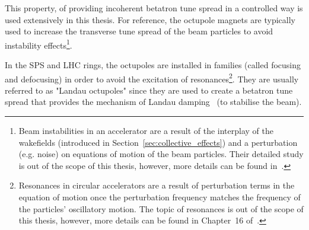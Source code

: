 


This property, of providing incoherent betatron tune spread in a controlled way is used extensively in this thesis. %
For reference, the octupole magnets are typically used to increase the transverse tune spread of the beam particles to avoid %
instability effects\footnote{Beam instabilities in an accelerator are a result of the interplay of the wakefields (introduced in Section~\ref{sec:collective_effects}) and a perturbation (e.g. noise) on equations of motion of the beam particles. Their detailed study is out of the scope of this thesis, however, more details can be found in~\cite{Rumolo:1982422}.}. 


In the SPS and LHC rings, the octupoles are installed in families (called focusing and defocusing) in order to avoid the excitation of resonances\footnote{Resonances in circular accelerators are a result of perturbation terms in the equation of motion once the perturbation frequency matches the frequency of the particles' oscillatory motion. The topic of resonances is out of the scope of this thesis, however, more details can be found in Chapter~16 of~\cite{Wiedemann:1083415}.}. They are usually referred to as "Landau octupoles" since they are used to create a betatron tune spread that provides the mechanism of Landau damping~\cite{Herr:1982428} (to stabilise the beam).

